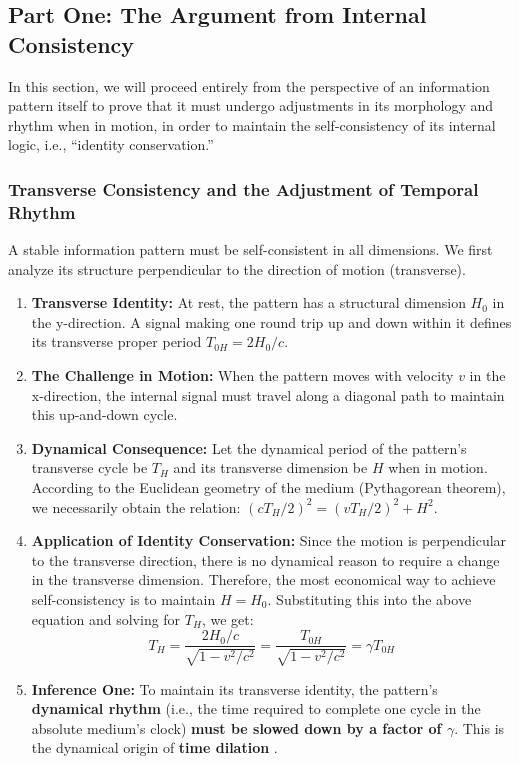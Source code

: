 \documentclass[11pt, a4paper]{article}
\begin{document}
\subsection*{Part One: The Argument from Internal Consistency}

In this section, we will proceed entirely from the perspective of an information pattern itself to prove that it must undergo adjustments in its morphology and rhythm when in motion, in order to maintain the self-consistency of its internal logic, i.e., ``identity conservation.''

\subsubsection{Transverse Consistency and the Adjustment of Temporal Rhythm}

A stable information pattern must be self-consistent in all dimensions. We first analyze its structure perpendicular to the direction of motion (transverse).

\begin{enumerate}
    \item \textbf{Transverse Identity:} At rest, the pattern has a structural dimension $H_0$ in the y-direction. A signal making one round trip up and down within it defines its transverse proper period $T_{0H} = 2H_0 / c$.
    \item \textbf{The Challenge in Motion:} When the pattern moves with velocity $v$ in the x-direction, the internal signal must travel along a diagonal path to maintain this up-and-down cycle.
    \item \textbf{Dynamical Consequence:} Let the dynamical period of the pattern's transverse cycle be $T_H$ and its transverse dimension be $H$ when in motion. According to the Euclidean geometry of the medium (Pythagorean theorem), we necessarily obtain the relation: $(c T_H / 2)^2 = (v T_H / 2)^2 + H^2$.
    \item \textbf{Application of Identity Conservation:} Since the motion is perpendicular to the transverse direction, there is no dynamical reason to require a change in the transverse dimension. Therefore, the most economical way to achieve self-consistency is to maintain $H = H_0$. Substituting this into the above equation and solving for $T_H$, we get:
    \[
    T_H = \frac{2H_0/c}{\sqrt{1 - v^2/c^2}} = \frac{T_{0H}}{\sqrt{1 - v^2/c^2}} = \gamma T_{0H}
    \]
    \item \textbf{Inference One:} To maintain its transverse identity, the pattern's \textbf{dynamical rhythm} (i.e., the time required to complete one cycle in the absolute medium's clock) \textbf{must be slowed down by a factor of $\gamma$}. This is the dynamical origin of \textbf{time dilation} \cite{Einstein1905}.
\end{enumerate}
\end{document}
